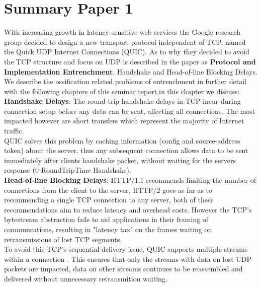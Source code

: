 \section{Summary Paper 1}
\label{sec:Summary Paper 1}
With increasing growth in latency-sensitive web services the Google research group decided to design a new transport protocol independent of TCP, named the Quick UDP Internet Connections (QUIC). As to why they decided to avoid the TCP structure and focus on UDP is described in the paper as \textbf{Protocol and Implementation Entrenchment}, Handshake and Head-of-line Blocking Delays. We describe the ossification related problems of entrenchment in further detail with the following chapters of this seminar report,in this chapter we discuss:\\
\hspace*{1em}\textbf{Handshake Delays}: The round-trip handshake delays in TCP incur during connection setup before any data can be sent, affecting all connections. The most impacted however are short transfers which represent the majority of Internet traffic. \\
QUIC solves this problem by caching information (config and source-address token) about the server, thus any subsequent connection allows data to be sent immediately after clients handshake packet, without waiting for the servers response (0-RoundTripTime Handshake). \\
\hspace*{1em}\textbf{Head-of-line Blocking Delays}: HTTP/1.1 recommends limiting the number of connections from the client to the server, HTTP/2 goes as far as to recommending a single TCP connection to any server, both of these recommendations aim to reduce latency and overhead costs. However the TCP's bytestream abstraction fails to aid applications in their framing of communcations, resulting in "latency tax" \cite{langley2017quic} on the frames waiting on retransmissions of lost TCP segments.\\ 
To avoid this TCP's sequential delivery issue, QUIC supports multiple streams within a connection \cite{langley2017quic}. This ensures that only the streams with data on lost UDP packets are impacted, data on other streams continues to be reassembled and delivered without unnecessary retransmition waiting.

